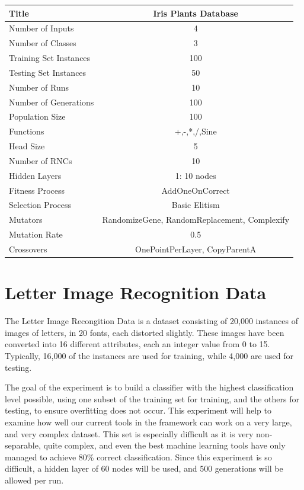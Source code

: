 \documentclass[a4paper,11pt]{report}
\begin{document}
\begin{tabular}{| l | c |}
 \hline
 Title & Iris Plants Database \\
 \hline
 Number of Inputs & 4 \\
 Number of Classes & 3 \\
 Training Set Instances & 100 \\
 Testing Set Instances & 50 \\
 Number of Runs & 10 \\
 Number of Generations & 100 \\
 Population Size & 100 \\
 Functions & +,-,*,/,Sine \\
 Head Size & 5 \\
 Number of RNCs & 10 \\
 Hidden Layers & 1: 10 nodes \\
 Fitness Process & AddOneOnCorrect \\
 Selection Process & Basic Elitism \\
 Mutators & RandomizeGene, RandomReplacement, Complexify \\
 Mutation Rate & 0.5 \\
 Crossovers & OnePointPerLayer, CopyParentA \\ 
 \hline
\end{tabular}


\section{Letter Image Recognition Data}
 The Letter Image Recongition Data is a dataset consisting of 20,000 instances of images of letters, in 
20 fonts, each distorted slightly. These images have been converted into 16 different attributes, each an 
integer value from 0 to 15. Typically, 16,000 of the instances are used for training, while 4,000 are used for
testing.

The goal of the experiment is to build a classifier with the highest classification level possible, 
using one subset of the training set for training, and the others for testing, to ensure overfitting 
does not occur. This experiment will help to examine how well our current tools in the framework can work 
on a very large, and very complex dataset. This set is especially difficult as it is very non-separable, quite 
complex, and even the best machine learning tools have only managed to achieve 80\% correct classification.
Since this experiment is so difficult, a hidden layer of 60 nodes will be used, and 500 generations will be allowed
per run. 
\end{document}
